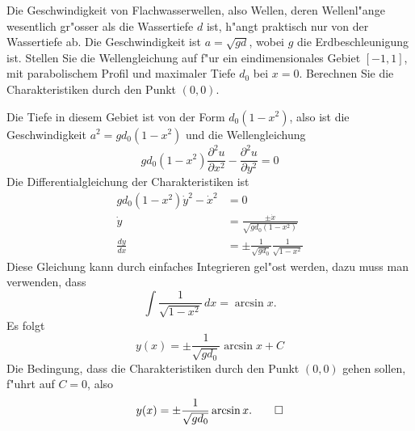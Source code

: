 Die Geschwindigkeit von Flachwasserwellen, also Wellen, deren Wellenl"ange
wesentlich gr"osser als die Wassertiefe $d$ ist, h"angt praktisch
nur von der Wassertiefe ab.  Die Geschwindigkeit ist $a=\sqrt{gd}$, wobei
$g$ die Erdbeschleunigung ist. Stellen Sie die Wellengleichung auf
f"ur ein eindimensionales Gebiet $[-1,1]$, mit parabolischem Profil
und maximaler Tiefe $d_0$ bei $x=0$. Berechnen Sie die Charakteristiken
durch den Punkt $(0,0)$.

\begin{loesung}
Die Tiefe in diesem Gebiet ist von der Form $d_0(1-x^2)$, also ist
die Geschwindigkeit $a^2=gd_0(1-x^2)$ und die Wellengleichung
\[
gd_0(1-x^2)\frac{\partial^2 u}{\partial x^2}-\frac{\partial^2u}{\partial y^2}=0
\]
Die Differentialgleichung der Charakteristiken ist
\begin{align*}
gd_0(1-x^2)\dot y^2-\dot x^2&=0
\\
\dot y&=
\frac{\pm\dot x}{\sqrt{gd_0(1-x^2)}}
\\
\frac{dy}{dx}
&=
\pm\frac1{\sqrt{gd_0}}\frac1{\sqrt{1-x^2}}
\end{align*}
Diese Gleichung kann durch einfaches Integrieren gel"ost werden,
dazu muss man verwenden, dass
\[
\int \frac1{\sqrt{1-x^2}}\,dx = \arcsin x.
\]
Es folgt
\[
y(x)
=
\pm\frac1{\sqrt{gd_0}}\arcsin x + C
\]
Die Bedingung, dass die Charakteristiken durch den Punkt $(0,0)$
gehen sollen, f"uhrt auf $C=0$, also
\[
y(x)=\pm\frac1{\sqrt{gd_0}}\arcsin x.
\qedhere
\]
\end{loesung}

